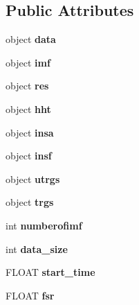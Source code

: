\subsection*{Public Attributes}
\begin{DoxyCompactItemize}
\item 
\hypertarget{classetagen_a3cfb884ad14da38b25052cd1b5d8402f}{object {\bfseries data}}\label{classetagen_a3cfb884ad14da38b25052cd1b5d8402f}

\item 
\hypertarget{classetagen_a73f250a4cb0314f22349591f7b57989b}{object {\bfseries imf}}\label{classetagen_a73f250a4cb0314f22349591f7b57989b}

\item 
\hypertarget{classetagen_a08b95f16fd83fc0a7f46f68a1a2be98e}{object {\bfseries res}}\label{classetagen_a08b95f16fd83fc0a7f46f68a1a2be98e}

\item 
\hypertarget{classetagen_a42717ae51e69ab8298f349579ebb019e}{object {\bfseries hht}}\label{classetagen_a42717ae51e69ab8298f349579ebb019e}

\item 
\hypertarget{classetagen_a78dc150f9c2228ebfd864be3f37ec09e}{object {\bfseries insa}}\label{classetagen_a78dc150f9c2228ebfd864be3f37ec09e}

\item 
\hypertarget{classetagen_ab3de55a755a2603d6048fc3ec24b4b34}{object {\bfseries insf}}\label{classetagen_ab3de55a755a2603d6048fc3ec24b4b34}

\item 
\hypertarget{classetagen_a3a6debd32d5829c80fd521bb4c8f4576}{object {\bfseries utrgs}}\label{classetagen_a3a6debd32d5829c80fd521bb4c8f4576}

\item 
\hypertarget{classetagen_a1c138474ec98a0fe4a477c41b429b371}{object {\bfseries trgs}}\label{classetagen_a1c138474ec98a0fe4a477c41b429b371}

\item 
\hypertarget{classetagen_aad5224aff725e4b42df5b60a73e26bef}{int {\bfseries numberofimf}}\label{classetagen_aad5224aff725e4b42df5b60a73e26bef}

\item 
\hypertarget{classetagen_a5e2d9467f1dc2d4628279bb22d42fd47}{int {\bfseries data\-\_\-size}}\label{classetagen_a5e2d9467f1dc2d4628279bb22d42fd47}

\item 
\hypertarget{classetagen_ad53886908196e2bffbf9f254df8550b8}{F\-L\-O\-A\-T {\bfseries start\-\_\-time}}\label{classetagen_ad53886908196e2bffbf9f254df8550b8}

\item 
\hypertarget{classetagen_a596e93d478b86cac0b90943f06ff2dd6}{F\-L\-O\-A\-T {\bfseries fsr}}\label{classetagen_a596e93d478b86cac0b90943f06ff2dd6}

\end{DoxyCompactItemize}


